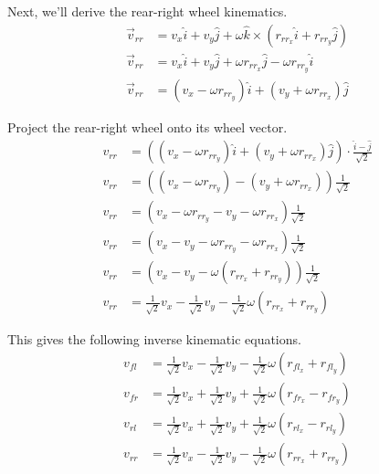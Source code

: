 Next, we'll derive the rear-right wheel kinematics.
\begin{align*}
  \vec{v}_{rr} &= v_x \hat{i} + v_y \hat{j} +
    \omega \hat{k} \times (r_{rr_x} \hat{i} + r_{rr_y} \hat{j}) \\
  \vec{v}_{rr} &= v_x \hat{i} + v_y \hat{j} +
    \omega r_{rr_x} \hat{j} - \omega r_{rr_y} \hat{i} \\
  \vec{v}_{rr} &= (v_x - \omega r_{rr_y}) \hat{i} +
    (v_y + \omega r_{rr_x}) \hat{j}
\end{align*}

Project the rear-right wheel onto its wheel vector.
\begin{align}
  v_{rr} &= ((v_x - \omega r_{rr_y}) \hat{i} + (v_y + \omega r_{rr_x}) \hat{j})
    \cdot \frac{\hat{i} - \hat{j}}{\sqrt{2}} \nonumber \\
  v_{rr} &= ((v_x - \omega r_{rr_y}) - (v_y + \omega r_{rr_x}))
    \frac{1}{\sqrt{2}} \nonumber \\
  v_{rr} &= (v_x - \omega r_{rr_y} - v_y - \omega r_{rr_x})
    \frac{1}{\sqrt{2}} \nonumber \\
  v_{rr} &= (v_x - v_y - \omega r_{rr_y} - \omega r_{rr_x})
    \frac{1}{\sqrt{2}} \nonumber \\
  v_{rr} &= (v_x - v_y - \omega (r_{rr_x} + r_{rr_y}))
    \frac{1}{\sqrt{2}} \nonumber \\
  v_{rr} &= \frac{1}{\sqrt{2}} v_x - \frac{1}{\sqrt{2}} v_y -
    \frac{1}{\sqrt{2}} \omega (r_{rr_x} + r_{rr_y})
\end{align}

This gives the following inverse kinematic equations.
\begin{align*}
  v_{fl} &= \frac{1}{\sqrt{2}} v_x - \frac{1}{\sqrt{2}} v_y -
    \frac{1}{\sqrt{2}} \omega (r_{fl_x} + r_{fl_y}) \\
  v_{fr} &= \frac{1}{\sqrt{2}} v_x + \frac{1}{\sqrt{2}} v_y +
    \frac{1}{\sqrt{2}} \omega (r_{fr_x} - r_{fr_y}) \\
  v_{rl} &= \frac{1}{\sqrt{2}} v_x + \frac{1}{\sqrt{2}} v_y +
    \frac{1}{\sqrt{2}} \omega (r_{rl_x} - r_{rl_y}) \\
  v_{rr} &= \frac{1}{\sqrt{2}} v_x - \frac{1}{\sqrt{2}} v_y -
    \frac{1}{\sqrt{2}} \omega (r_{rr_x} + r_{rr_y})
\end{align*}

